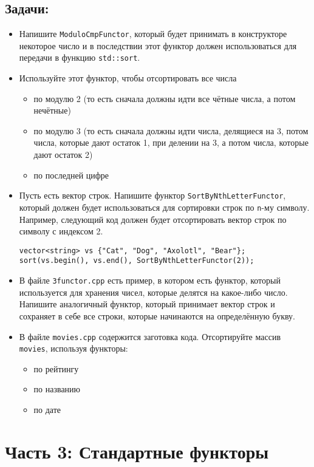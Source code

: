 \documentclass{article}
\begin{document}
\subsection*{Задачи:}
\begin{itemize}
\item Напишите \texttt{ModuloCmpFunctor}, который будет принимать в конструкторе некоторое число и в последствии этот функтор должен использоваться для передачи в функцию \texttt{std::sort}. 
\item Используйте этот функтор, чтобы отсортировать все числа 
\begin{itemize}
\item по модулю 2 (то есть сначала должны идти все чётные числа, а потом нечётные)
\item по модулю 3 (то есть сначала должны идти числа, делящиеся на 3, потом числа, которые дают остаток 1, при делении на 3, а потом числа, которые дают остаток 2)
\item по последней цифре
\end{itemize}
\item Пусть есть вектор строк. Напишите функтор \texttt{SortByNthLetterFunctor}, который должен будет использоваться для сортировки строк по \texttt{n}-му символу. Например, следующий код должен будет отсортировать вектор строк по символу с индексом 2. 
\begin{lstlisting}
vector<string> vs {"Cat", "Dog", "Axolotl", "Bear"};
sort(vs.begin(), vs.end(), SortByNthLetterFunctor(2));
\end{lstlisting}
\item В файле \texttt{3functor.cpp} есть пример, в котором есть функтор, который используется для хранения чисел, которые делятся на какое-либо число. Напишите аналогичный функтор, который принимает вектор строк и сохраняет в себе все строки, которые начинаются на определённую букву.
\item В файле \texttt{movies.cpp} содержится заготовка кода. Отсортируйте массив \texttt{movies}, используя функторы:
\begin{itemize}
\item по рейтингу
\item по названию
\item по дате
\end{itemize}
\end{itemize}

\section*{Часть 3: Стандартные функторы}
\end{document}
